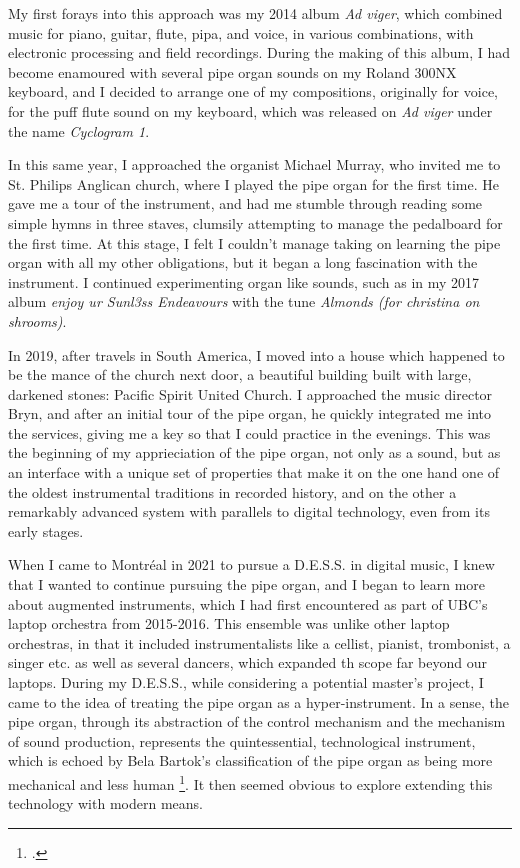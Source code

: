 \documentclass[12pt,twoside,maitrise]{dms_ks}
\theoremstyle{definition}
\begin{document}
My first forays into this approach was my 2014 album \textit{Ad viger}, which combined music for piano, guitar, flute, pipa, and voice, in various combinations, with electronic processing and field recordings. 
During the making of this album, I had become enamoured with several pipe organ sounds on my Roland 300NX keyboard, and I decided to arrange one of my compositions, originally for voice, for the puff flute sound on my keyboard, which was released on \textit{Ad viger} under the name \textit{Cyclogram 1}.

In this same year, I approached the organist Michael Murray, who invited me to St. 
Philips Anglican church, where I played the pipe organ for the first time. 
He gave me a tour of the instrument, and had me stumble through reading some simple hymns in three staves, clumsily attempting to manage the pedalboard for the first time. 
At this stage, I felt I couldn't manage taking on learning the pipe organ with all my other obligations, but it began a long fascination with the instrument. 
I continued experimenting organ like sounds, such as in my 2017 album \textit{enjoy ur Sunl3ss Endeavours} with the tune \textit{Almonds (for christina on shrooms)}. 

In 2019, after travels in South America, I moved into a house which happened to be the mance of the church next door, a beautiful building built with large, darkened stones: Pacific Spirit United Church. 
I approached the music director Bryn, and after an initial tour of the pipe organ, he quickly integrated me into the services, giving me a key so that I could practice in the evenings. 
This was the beginning of my apprieciation of the pipe organ, not only as a sound, but as an interface with a unique set of properties that make it on the one hand one of the oldest instrumental traditions in recorded history, and on the other a remarkably advanced system with parallels to digital technology, even from its early stages.

When I came to Montréal in 2021 to pursue a D.E.S.S. in digital music, I knew that I wanted to continue pursuing the pipe organ, and I began to learn more about augmented instruments, which I had first encountered as part of UBC's laptop orchestra from 2015-2016. 
This ensemble was unlike other laptop orchestras, in that it included instrumentalists like a cellist, pianist, trombonist, a singer etc. 
as well as several dancers, which expanded th scope far beyond our laptops. 
During my D.E.S.S., while considering a potential master's project, I came to the idea of treating the pipe organ as a hyper-instrument. 
In a sense, the pipe organ, through its abstraction of the control mechanism and the mechanism of sound production, represents the quintessential, technological instrument, which is echoed by Bela Bartok's classification of the pipe organ as being more mechanical and less human \footcite[24]{jorda_digital_2005}. 
It then seemed obvious to explore extending this technology with modern means.
 
\end{document}
